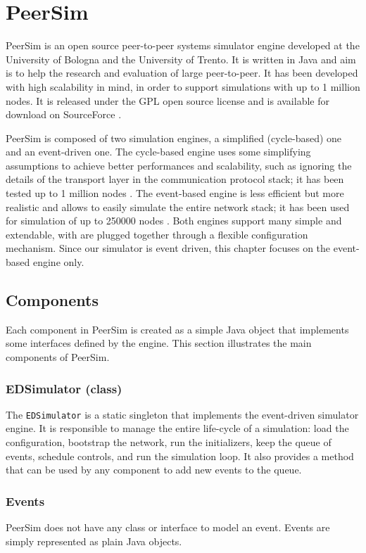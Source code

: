 \section{PeerSim}
PeerSim \cite{peersim_2009} is an open source peer-to-peer systems simulator engine developed at the University of Bologna and the University of Trento.
It is written in Java and aim is to help the research and evaluation of large peer-to-peer.
It has been developed with high scalability in mind, in order to support simulations with up to \num{1} million nodes.
It is released under the GPL open source license and is available for download on SourceForce \cite{peersim_site}.

\smallskip
PeerSim is composed of two simulation engines, a simplified (cycle-based) one and an event-driven one.
The cycle-based engine uses some simplifying assumptions to achieve better performances and scalability, such as ignoring the details of the transport layer in the communication protocol stack;
it has been tested up to \num{1} million nodes \cite{peersim_intro_2018}.
The event-based engine is less efficient but more realistic and allows to easily simulate the entire network stack;
it has been used for simulation of up to \num{250000} nodes \cite{peersim_intro_2018}.
Both engines support many simple and extendable, with are plugged together through a flexible configuration mechanism.
Since our simulator is event driven, this chapter focuses on the event-based engine only.

\subsection{Components}
Each component in PeerSim is created as a simple Java object that implements some interfaces defined by the engine.
This section illustrates the main components of PeerSim.

\subsubsection{EDSimulator (class)}
The \texttt{EDSimulator} is a static singleton that implements the event-driven simulator engine.
It is responsible to manage the entire life-cycle of a simulation:
load the configuration, bootstrap the network, run the initializers, keep the queue of events, schedule controls, and run the simulation loop.
It also provides a method that can be used by any component to add new events to the queue.

\subsubsection{Events}
PeerSim does not have any class or interface to model an event.
Events are simply represented as plain Java objects.

